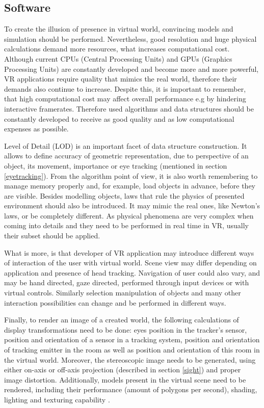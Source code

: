 \subsection{Software}%

To create the illusion of presence in virtual world, convincing models and simulation should be performed. Nevertheless, good resolution and huge physical calculations demand more resources, what increases computational cost. Although current CPUs (Central Processing Units) and GPUs (Graphics Processing Units) are constantly developed and become more and more powerful, VR applications require quality that mimics the real world, therefore their demands also continue to increase. Despite this, it is important to remember, that high computational cost may affect overall performance e.g by hindering interactive framerates.
Therefore used algorithms and data structures should be constantly developed to receive as good quality and as low computational expenses as possible.

Level of Detail (LOD) is an important facet of data structure construction. It allows to define accuracy of geometric representation, due to perspective of an object, its movement, importance or eye tracking (mentioned in section \ref{eyetracking}). From the algorithm point of view, it is also worth remembering to manage memory properly and, for example, load objects in advance, before they are visible. Besides modelling objects, laws that rule the physics of presented environment should also be introduced. It may mimic the real ones, like Newton's laws, or be completely different. As physical phenomena are very complex when coming into details and they need to be performed in real time in VR, usually their subset should be applied. 

What is more, is that developer of VR application may introduce different ways of interaction of the user with virtual world. Scene view may differ depending on application and presence of head tracking. Navigation of user could also vary, and may be hand  directed, gaze directed, performed through input devices or with virtual controls. Similarly selection manipulation of objects and many other interaction possibilities can change and be performed in different ways.

Finally, to render an image of a created world, the following calculations of display transformations need to be done: eyes position in the tracker's sensor, position and orientation of a sensor in a tracking system, position and orientation of tracking emitter in the room as well as position and orientation of this room in the virtual world. Moreover, the stereoscopic image needs to be generated, using either on-axis or off-axis projection (described in section \ref{sight}) and proper image distortion. Additionally, models present in the virtual scene need to be rendered, including their performance (amount of polygons per second), shading, lighting and texturing capability \cite{Mazuryk96}. 
